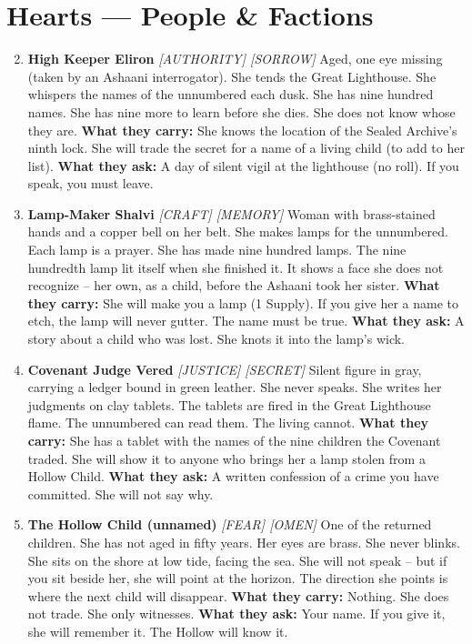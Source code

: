 \section*{Hearts --- People \& Factions}
\label{sec:galanina-people}
\begin{enumerate}
\setcounter{enumi}{1}
\item \textbf{High Keeper Eliron} \hfill \textit{[AUTHORITY] [SORROW]}  
  Aged, one eye missing (taken by an Ashaani interrogator). She tends the Great Lighthouse. She whispers the names of the unnumbered each dusk. She has nine hundred names. She has nine more to learn before she dies. She does not know whose they are.  
  \textbf{What they carry:} She knows the location of the Sealed Archive's ninth lock. She will trade the secret for a name of a living child (to add to her list).  
  \textbf{What they ask:} A day of silent vigil at the lighthouse (no roll). If you speak, you must leave.

\item \textbf{Lamp-Maker Shalvi} \hfill \textit{[CRAFT] [MEMORY]}  
  Woman with brass-stained hands and a copper bell on her belt. She makes lamps for the unnumbered. Each lamp is a prayer. She has made nine hundred lamps. The nine hundredth lamp lit itself when she finished it. It shows a face she does not recognize -- her own, as a child, before the Ashaani took her sister.  
  \textbf{What they carry:} She will make you a lamp (1 Supply). If you give her a name to etch, the lamp will never gutter. The name must be true.  
  \textbf{What they ask:} A story about a child who was lost. She knots it into the lamp's wick.

\item \textbf{Covenant Judge Vered} \hfill \textit{[JUSTICE] [SECRET]}  
  Silent figure in gray, carrying a ledger bound in green leather. She never speaks. She writes her judgments on clay tablets. The tablets are fired in the Great Lighthouse flame. The unnumbered can read them. The living cannot.  
  \textbf{What they carry:} She has a tablet with the names of the nine children the Covenant traded. She will show it to anyone who brings her a lamp stolen from a Hollow Child.  
  \textbf{What they ask:} A written confession of a crime you have committed. She will not say why.

\item \textbf{The Hollow Child (unnamed)} \hfill \textit{[FEAR] [OMEN]}  
  One of the returned children. She has not aged in fifty years. Her eyes are brass. She never blinks. She sits on the shore at low tide, facing the sea. She will not speak -- but if you sit beside her, she will point at the horizon. The direction she points is where the next child will disappear.  
  \textbf{What they carry:} Nothing. She does not trade. She only witnesses.  
  \textbf{What they ask:} Your name. If you give it, she will remember it. The Hollow will know it.


\end{enumerate}
